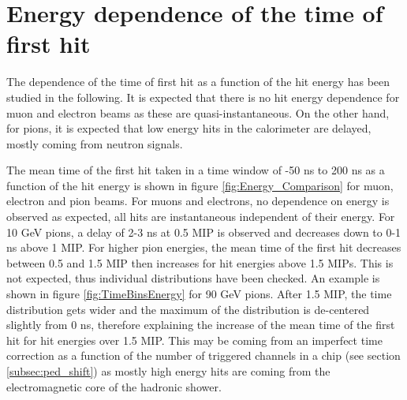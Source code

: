 \section{Energy dependence of the time of first hit}

The dependence of the time of first hit as a function of the hit energy has been studied in the following. It is expected that there is no hit energy dependence for muon and electron beams as these are quasi-instantaneous. On the other hand, for pions, it is expected that low energy hits in the calorimeter are delayed, mostly coming from neutron signals.

The mean time of the first hit taken in a time window of -50 ns to 200 ns as a function of the hit energy is shown in figure \ref{fig:Energy_Comparison} for muon, electron and pion beams. For muons and electrons, no dependence on energy is observed as expected, all hits are instantaneous independent of their energy. For 10 GeV pions, a delay of 2-3 ns at 0.5 MIP is observed and decreases down to 0-1 ns above 1 MIP. For higher pion energies, the mean time of the first hit decreases between 0.5 and 1.5 MIP then increases for hit energies above 1.5 MIPs. This is not expected, thus individual distributions have been checked. An example is shown in figure \ref{fig:TimeBinsEnergy} for 90 GeV pions. After 1.5 MIP, the time distribution gets wider and the maximum of the distribution is de-centered slightly from 0 ns, therefore explaining the increase of the mean time of the first hit for hit energies over 1.5 MIP. This may be coming from an imperfect time correction as a function of the number of triggered channels in a chip (see section \ref{subsec:ped_shift}) as mostly high energy hits are coming from the electromagnetic core of the hadronic shower.

